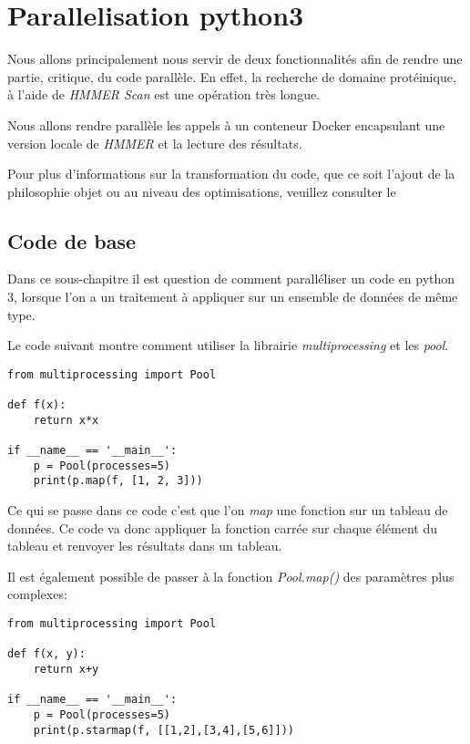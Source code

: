 \chapter{Parallelisation python3}
\label{ch:parallel}

Nous allons principalement nous servir de deux fonctionnalités afin de rendre une partie, critique, du code parallèle. En effet, la recherche de domaine protéinique, à l'aide de \emph{HMMER Scan} est une opération très longue.

Nous allons rendre parallèle les appels à un conteneur Docker encapsulant une version locale de \emph{HMMER} et la lecture des résultats.

Pour plus d'informations sur la transformation du code, que ce soit l'ajout de la philosophie objet ou au niveau des optimisations, veuillez consulter le 

\section{Code de base}

Dans ce sous-chapitre il est question de comment paralléliser un code en python 3, lorsque l'on a un traitement à appliquer sur un ensemble de données de même type.

Le code suivant montre comment utiliser la librairie \emph{multiprocessing} et les \emph{pool}.

\lstset{language=python}
\begin{lstlisting}[frame=single]
from multiprocessing import Pool

def f(x):
    return x*x

if __name__ == '__main__':
    p = Pool(processes=5)
    print(p.map(f, [1, 2, 3]))
\end{lstlisting} 

Ce qui se passe dans ce code c'est que l'on \emph{map} une fonction sur un tableau de données. Ce code va donc appliquer la fonction carrée sur chaque élément du tableau et renvoyer les résultats dans un tableau.

Il est également possible de passer à la fonction \emph{Pool.map()} des paramètres plus complexes:

\lstset{language=python}
\begin{lstlisting}[frame=single]
from multiprocessing import Pool

def f(x, y):
    return x+y

if __name__ == '__main__':
    p = Pool(processes=5)
    print(p.starmap(f, [[1,2],[3,4],[5,6]]))
\end{lstlisting} 


